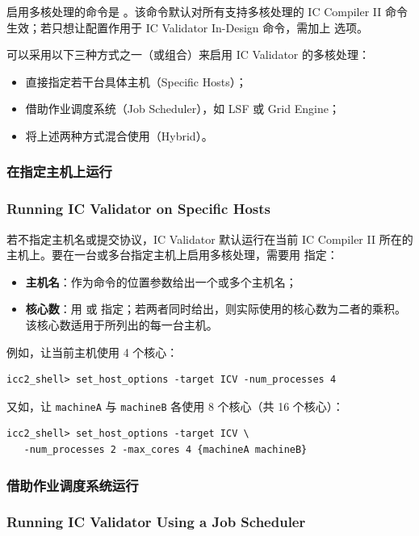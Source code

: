 启用多核处理的命令是 。该命令默认对所有支持多核处理的 IC Compiler II 命令生效；若只想让配置作用于 IC Validator In-Design 命令，需加上  选项。

可以采用以下三种方式之一（或组合）来启用 IC Validator 的多核处理：
\begin{itemize}
  \item 直接指定若干台具体主机（Specific Hosts）；
  \item 借助作业调度系统（Job Scheduler），如 LSF 或 Grid Engine；
  \item 将上述两种方式混合使用（Hybrid）。
\end{itemize}

\subsubsection{在指定主机上运行}
\subsubsection*{Running IC Validator on Specific Hosts}

若不指定主机名或提交协议，IC Validator 默认运行在当前 IC Compiler II 所在的主机上。要在一台或多台指定主机上启用多核处理，需要用  指定：
\begin{itemize}
  \item \textbf{主机名}：作为命令的位置参数给出一个或多个主机名；
  \item \textbf{核心数}：用  或  指定；若两者同时给出，则实际使用的核心数为二者的乘积。该核心数适用于所列出的每一台主机。
\end{itemize}

例如，让当前主机使用 4 个核心：
\begin{lstlisting}
icc2_shell> set_host_options -target ICV -num_processes 4
\end{lstlisting}

又如，让 \texttt{machineA} 与 \texttt{machineB} 各使用 8 个核心（共 16 个核心）：
\begin{lstlisting}
icc2_shell> set_host_options -target ICV \
   -num_processes 2 -max_cores 4 {machineA machineB}
\end{lstlisting}

\subsubsection{借助作业调度系统运行}
\subsubsection*{Running IC Validator Using a Job Scheduler}

